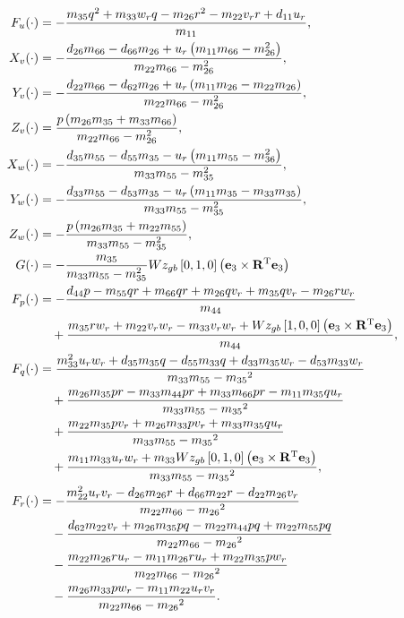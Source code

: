 \begin{subequations}
    \begin{align}
        F_u(\cdot) &= -\frac{m_{35}q^2+m_{33}w_rq-m_{26}r^2-m_{22}v_rr+d_{11}u_r}{m_{11}}, \\
        X_v(\cdot) &= - \frac{d_{26}m_{66} - d_{66}m_{26} + u_r\left(m_{11}m_{66} - m_{26}^2\right)}{m_{22}m_{66} - m_{26}^2}, \\
        Y_v(\cdot) &= - \frac{d_{22}m_{66} - d_{62}m_{26} + u_r\left(m_{11}m_{26} - m_{22}m_{26}\right)}{m_{22}m_{66} - m_{26}^2}, \\
        Z_v(\cdot) &= \frac{p\left(m_{26}m_{35} + m_{33}m_{66}\right)}{m_{22}m_{66} - m_{26}^2}, \\
        X_w(\cdot) &= - \frac{d_{35}m_{55} - d_{55}m_{35} - u_r\left(m_{11}m_{55} - m_{36}^2\right)}{m_{33}m_{55} - m_{35}^2}, \\
        Y_w(\cdot) &= - \frac{d_{33}m_{55} - d_{53}m_{35} - u_r\left(m_{11}m_{35} - m_{33}m_{35}\right)}{m_{33}m_{55} - m_{35}^2}, \\
        Z_w(\cdot) &= - \frac{p\left(m_{26}m_{35} + m_{22}m_{55}\right)}{m_{33}m_{55} - m_{35}^2}, \\
        G(\cdot) &= -\frac{m_{35}}{m_{33}m_{55} - m_{35}^2} W z_{gb} \left[0, 1, 0\right] \left(\mathbf{e}_3 \times \mathbf{R}^{\mathrm{T}} \mathbf{e}_3\right) \\
        F_p(\cdot) &= -\frac{d_{44}p-m_{55}qr+m_{66}qr+m_{26}qv_r+m_{35}qv_r-m_{26}rw_r}{m_{44}} \\
        &\quad + \frac{m_{35}rw_r+m_{22}v_rw_r-m_{33}v_rw_r + W z_{gb} \left[1, 0, 0\right] \left(\mathbf{e}_3 \times \mathbf{R}^{\mathrm{T}} \mathbf{e}_3\right)}{m_{44}}, \nonumber \\
        F_q(\cdot) &= \frac{m_{33}^2u_rw_r+d_{35}m_{35}q-d_{55}m_{33}q+d_{33}m_{35}w_r-d_{53}m_{33}w_r}{m_{33}m_{55}-{m_{35}}^2} \\
        &\quad + \frac{m_{26}m_{35}pr-m_{33}m_{44}pr+m_{33}m_{66}pr-m_{11}m_{35}qu_r}{m_{33}m_{55}-{m_{35}}^2} \nonumber \\
        &\quad + \frac{m_{22}m_{35}pv_r+m_{26}m_{33}pv_r+m_{33}m_{35}qu_r}{m_{33}m_{55}-{m_{35}}^2} \nonumber \\
        &\quad + \frac{m_{11}m_{33}u_rw_r+m_{33} W z_{gb} \left[0, 1, 0\right] \left(\mathbf{e}_3 \times \mathbf{R}^{\mathrm{T}} \mathbf{e}_3\right)}{m_{33}m_{55}-{m_{35}}^2}, \nonumber \\
        F_r(\cdot) &= -\frac{m_{22}^2u_rv_r-d_{26}m_{26}r+d_{66}m_{22}r-d_{22}m_{26}v_r}{m_{22}m_{66}-{m_{26}}^2} \\
        &\quad - \frac{d_{62}m_{22}v_r+m_{26}m_{35}pq-m_{22}m_{44}pq+m_{22}m_{55}pq}{m_{22}m_{66}-{m_{26}}^2} \nonumber \\
        &\quad - \frac{m_{22}m_{26}ru_r-m_{11}m_{26}ru_r+m_{22}m_{35}pw_r}{m_{22}m_{66}-{m_{26}}^2} \nonumber \\
        &\quad - \frac{m_{26}m_{33}pw_r-m_{11}m_{22}u_rv_r}{m_{22}m_{66}-{m_{26}}^2}. \nonumber
    \end{align}
\end{subequations}

